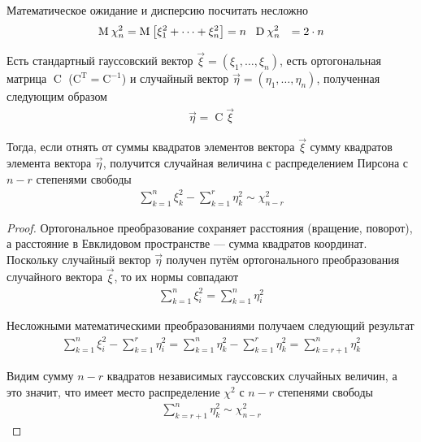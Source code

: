 Математическое ожидание и дисперсию посчитать несложно
\begin{align*}
  \operatorname{M}_{} \chi_n^2 &= \operatorname{M}_{} \left[ \xi_1^2 + \dots + \xi_n^2 \right] = n \ \
  \operatorname{D}_{} \chi_n^2 &= 2 \cdot n
\end{align*}

\begin{lemma}[Фишера]
  Есть стандартный гауссовский вектор
  $\vec{\xi} = \left( \xi_1, \dots, \xi_n \right)$, есть ортогональная матрица
  $\operatorname{C}$ ($\operatorname{C^T} = \operatorname{C^{-1}}$) и
  случайный вектор $\vec{\eta} = \left( \eta_1, \dots, \eta_n \right)$,
  полученная следующим образом
  \begin{align*}
      \vec{\eta} = \operatorname{C} \vec{\xi}
  \end{align*}

  Тогда, если отнять от суммы квадратов элементов вектора $\vec{\xi}$ сумму
  квадратов элемента вектора $\vec{\eta}$, получится случайная величина
  с распределением Пирсона с $n-r$ степенями свободы
  \begin{align*}
      \sum_{k=1}^{n} \xi_k^2 - \sum_{k=1}^{r} \eta_k^2 \sim \chi_{n-r}^2
  \end{align*}
\end{lemma}
\begin{proof}
  Ортогональное преобразование сохраняет расстояния (вращение, поворот), а
  расстояние в Евклидовом пространстве --- сумма квадратов координат.
  Поскольку случайный вектор $\vec{\eta}$ получен путём ортогонального
  преобразования случайного вектора $\vec{\xi}$, то их нормы совпадают
  \begin{align*}
      \sum_{k=1}^{n}\xi_i^2 = \sum_{k=1}^{n}\eta_i^2
  \end{align*}

  Несложными математическими преобразованиями получаем следующий результат
  \begin{align*}
      \sum_{k=1}^{n} \xi_i^2 - \sum_{k=1}^{r} \eta_i^2
      = \sum_{k=1}^{n} \eta_k^2 - \sum_{k=1}^{r} \eta_k^2
      = \sum_{k=r+1}^{n} \eta_k^2
  \end{align*}

  Видим сумму $n-r$ квадратов независимых гауссовских случайных величин,
  а это значит, что имеет место распределение $\chi^2$ с $n-r$ степенями
  свободы
  \begin{align*}
      \sum_{k=r+1}^{n} \eta_k^2 \sim \chi_{n-r}^2
  \end{align*}
\end{proof}

